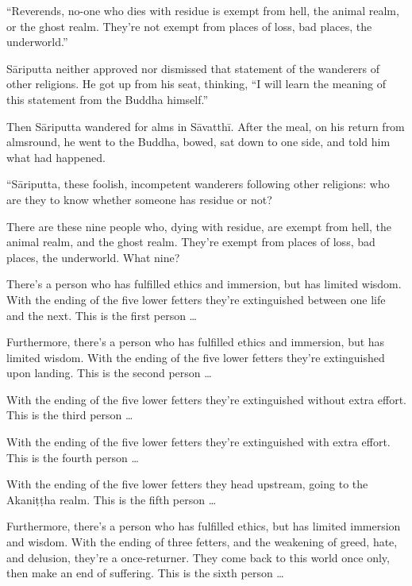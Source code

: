 \documentclass[12pt,openany]{book}%
\begin{document}
“Reverends, no-one who dies with residue is exempt from hell, the animal realm, or the ghost realm. They’re not exempt from places of loss, bad places, the underworld.” 

\textsanskrit{Sāriputta} neither approved nor dismissed that statement of the wanderers of other religions. He got up from his seat, thinking, “I will learn the meaning of this statement from the Buddha himself.” 

Then \textsanskrit{Sāriputta} wandered for alms in \textsanskrit{Sāvatthī}. After the meal, on his return from almsround, he went to the Buddha, bowed, sat down to one side, and told him what had happened. 

“\textsanskrit{Sāriputta}, these foolish, incompetent wanderers following other religions: who are they to know whether someone has residue or not? 

There are these nine people who, dying with residue, are exempt from hell, the animal realm, and the ghost realm. They’re exempt from places of loss, bad places, the underworld. What nine? 

There’s a person who has fulfilled ethics and immersion, but has limited wisdom. With the ending of the five lower fetters they’re extinguished between one life and the next. This is the first person … 

Furthermore, there’s a person who has fulfilled ethics and immersion, but has limited wisdom. With the ending of the five lower fetters they’re extinguished upon landing. This is the second person … 

With the ending of the five lower fetters they’re extinguished without extra effort. This is the third person … 

With the ending of the five lower fetters they’re extinguished with extra effort. This is the fourth person … 

With the ending of the five lower fetters they head upstream, going to the \textsanskrit{Akaniṭṭha} realm. This is the fifth person … 

Furthermore, there’s a person who has fulfilled ethics, but has limited immersion and wisdom. With the ending of three fetters, and the weakening of greed, hate, and delusion, they’re a once-returner. They come back to this world once only, then make an end of suffering. This is the sixth person … 
\end{document}
